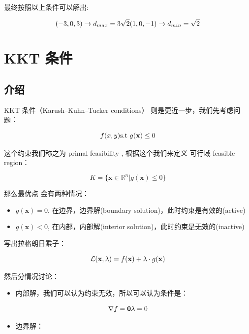 \documentclass[
]{book}
\providecommand{\tightlist}{%
  \setlength{\itemsep}{0pt}\setlength{\parskip}{0pt}}
\begin{document}
最终按照以上条件可以解出:

\[
(-3, 0, 3) \to d_{max} = 3\sqrt{2} \\
(1, 0, -1) \to d_{min} = \sqrt{2}
\]

\hypertarget{kkt-ux6761ux4ef6}{%
\section{KKT 条件}\label{kkt-ux6761ux4ef6}}

\hypertarget{ux4ecbux7ecd-1}{%
\subsection{介绍}\label{ux4ecbux7ecd-1}}

KKT 条件（Karush--Kuhn--Tucker conditions） 则是更近一步，我们先考虑问题：

\[
f(x,y) \\
\text{s.t } g(\mathbf{x}) \le 0
\]

这个约束我们称之为 primal feasibility , 根据这个我们来定义 可行域 feasible region：

\[
K = \{ \mathbf{x} \in \mathbb{R}^n | g(\mathbf{x}) \le  0\}
\]

那么最优点 会有两种情况：

\begin{itemize}
\tightlist
\item
  \(g(\mathbf{x}) = 0\), 在边界，边界解(boundary solution)，此时约束是有效的(active)
\item
  \(g(\mathbf{x}) < 0\), 在内部，内部解(interior solution)，此时约束是无效的(inactive)
\end{itemize}

写出拉格朗日乘子：

\[\mathcal {L}(\mathbf{x},\lambda )=f(\mathbf{x}) + \lambda \cdot g(\mathbf{x})\\\]

然后分情况讨论：

\begin{itemize}
\tightlist
\item
  内部解，我们可以认为约束无效，所以可以认为条件是：
\end{itemize}

\[
\nabla f = \mathbf{0} \\
\lambda  = 0
\]

\begin{itemize}
\tightlist
\item
  边界解：
\end{itemize}
\end{document}
